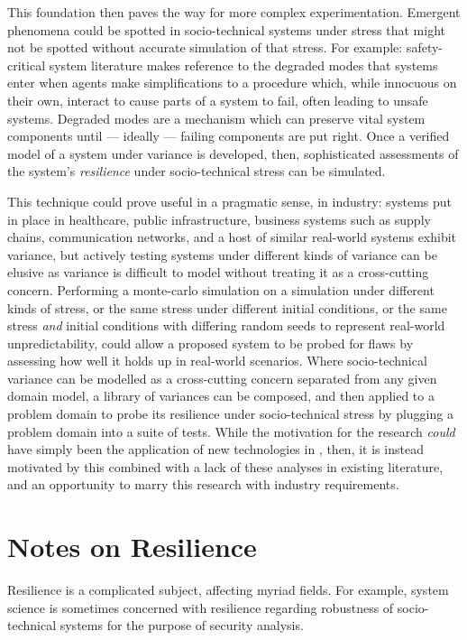 \documentclass[draft]{article}
\begin{document}
This foundation then paves the way for more complex experimentation. Emergent
phenomena could be spotted in socio-technical systems under stress that might not
be spotted without accurate simulation of that stress. For example:
safety-critical system literature makes reference to the degraded modes that
systems enter when agents make simplifications to a procedure which, while
innocuous on their own, interact to cause parts of a system to fail, often
leading to unsafe systems. Degraded modes are a mechanism which can preserve
vital system components until --- ideally --- failing components are put
right. Once a verified model of a system under variance is developed, then,
sophisticated assessments of the system's \emph{resilience} under
socio-technical stress can be simulated.\par

This technique could prove useful in a pragmatic sense, in industry: systems put
in place in healthcare, public infrastructure, business systems such as supply
chains, communication networks, and a host of similar real-world systems exhibit
variance, but actively testing systems under different kinds of variance can be
elusive as variance is difficult to model without treating it as a cross-cutting
concern\cite{caise_forum_18}. Performing a monte-carlo simulation on a
simulation under different kinds of stress, or the same stress under different
initial conditions, or the same stress \emph{and} initial conditions with
differing random seeds to represent real-world unpredictability, could allow a
proposed system to be probed for flaws by assessing how well it holds up in
real-world scenarios. Where socio-technical variance can be modelled as a
cross-cutting concern separated from any given domain model, a library of
variances can be composed, and then applied to a problem domain to probe its
resilience under socio-technical stress by plugging a problem domain into a suite
of tests. While the motivation for the research \emph{could} have simply been
the application of new technologies in \pdsf{}, then, it is instead motivated
by this combined with a lack of these analyses in existing literature, and an
opportunity to marry this research with industry requirements.\par



\section{Notes on Resilience}
\label{sec:resilience}
Resilience is a complicated subject, affecting myriad fields. For example,
system science is sometimes concerned with resilience regarding robustness of
socio-technical systems for the purpose of security
analysis\cite{bloomfeld_boundaryless_resilience}.
\end{document}
